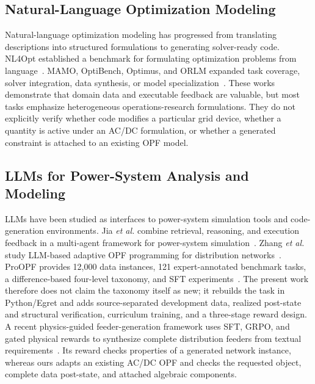 \documentclass[lettersize,journal]{IEEEtran}
\begin{document}
\subsection{Natural-Language Optimization Modeling}
Natural-language optimization modeling has progressed from translating descriptions into structured formulations to generating solver-ready code. NL4Opt established a benchmark for formulating optimization problems from language~\cite{ramamonjison2023nl4opt}. MAMO, OptiBench, Optimus, and ORLM expanded task coverage, solver integration, data synthesis, or model specialization~\cite{huang2024mamo,yang2025optibench,ahmaditeshnizi2023optimus,huang2025orlm}. These works demonstrate that domain data and executable feedback are valuable, but most tasks emphasize heterogeneous operations-research formulations. They do not explicitly verify whether code modifies a particular grid device, whether a quantity is active under an AC/DC formulation, or whether a generated constraint is attached to an existing OPF model.

\subsection{LLMs for Power-System Analysis and Modeling}
LLMs have been studied as interfaces to power-system simulation tools and code-generation environments. Jia \emph{et al.} combine retrieval, reasoning, and execution feedback in a multi-agent framework for power-system simulation~\cite{jia2025enhancing}. Zhang \emph{et al.} study LLM-based adaptive OPF programming for distribution networks~\cite{zhang2026automatic}. ProOPF provides 12,000 data instances, 121 expert-annotated benchmark tasks, a difference-based four-level taxonomy, and SFT experiments~\cite{shen2026proopf}. The present work therefore does not claim the taxonomy itself as new; it rebuilds the task in Python/Egret and adds source-separated development data, realized post-state and structural verification, curriculum training, and a three-stage reward design. A recent physics-guided feeder-generation framework uses SFT, GRPO, and gated physical rewards to synthesize complete distribution feeders from textual requirements~\cite{zhouFeeder}. Its reward checks properties of a generated network instance, whereas ours adapts an existing AC/DC OPF and checks the requested object, complete data post-state, and attached algebraic components.
\end{document}
